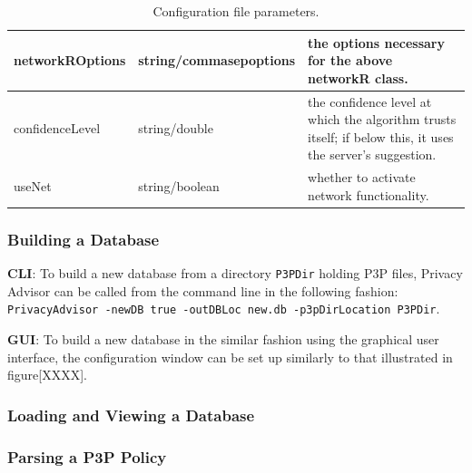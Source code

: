 \begin{center}
\begin{table}[h!]
\begin{tabular} { | l | l | p{7cm} | }
      networkROptions & string/commasepoptions	& the options necessary for the above networkR class. \\ \hline
      confidenceLevel & string/double & the confidence level at which the algorithm trusts itself; if below this, it uses the server's suggestion. \\ \hline
      useNet & string/boolean & whether to activate network functionality. \\ \hline
      \hline
    \end{tabular}
    \caption{Configuration file parameters.}
  \end{table}
\end{center}

\subsubsection{Building a Database}

\textbf{CLI}: To build a new database from a directory \texttt{P3PDir} holding P3P files, Privacy
Advisor can be called from the command line in the following fashion:
\texttt{PrivacyAdvisor -newDB  true -outDBLoc new.db
  -p3pDirLocation P3PDir}.

\textbf{GUI}: To build a new database in the similar fashion using the
graphical user interface, the configuration window can be set up
similarly to that illustrated in figure[XXXX].



\subsubsection{Loading and Viewing a Database}



\subsubsection{Parsing a P3P Policy}
